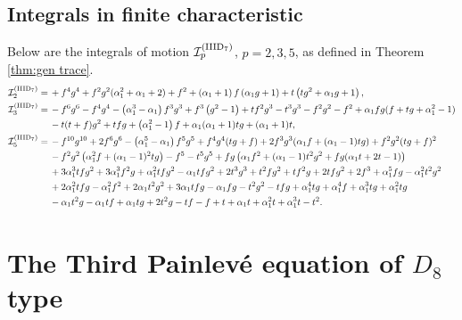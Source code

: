 \documentclass[a4paper,reqno]{amsart}
\numberwithin{equation}{section}
\numberwithin{figure}{section}
\theoremstyle{remark}
\begin{document}
\subsection{Integrals in finite characteristic}
Below are the integrals of motion $\mathcal{I}_p^{(\rm{IIID}_7)}$, $p=2,3,5$, as defined in Theorem \ref{thm:gen trace}.
\begin{align*}
\mathcal{I}_2^{(\rm{IIID}_7)} =\,&+f^4 g^4+f^2g^2(\alpha _1^2+\alpha _1+2)+f^2+\left(\alpha _1+1\right) f \left(\alpha _1 g+1\right)
+t \left(t g^2+\alpha _1 g+1\right),\\
\mathcal{I}_3^{(\rm{IIID}_7)} =\,&-f^6 g^6-f^4 g^4-\left(\alpha_1^3-\alpha_1\right) f^3 g^3+f^3 \left(g^2-1\right)+tf^2 g^3 -t^3g^3-f^2 g^2-f^2+\alpha_1 f g (f+t g+\alpha_1^2-1)\\
&-t  (t+f)g^2+t f g+\left(\alpha_1^2-1\right) f+\alpha_1 (\alpha_1+1) t g
+(\alpha_1+1) t,\\
 \mathcal{I}_5^{(\rm{IIID}_7)} =\,&
 -f^{10} g^{10}+2 f^6 g^6 
 -\left(\alpha_1^5-\alpha_1\right) f^5 g^5 +f^4 g^4 (t g+f)
 +2 f^3 g^3 (\alpha_1 f+(\alpha_1-1) t g)+f^2 g^2 (t g+f)^2\\
 & -f^2 g^2 \left(\alpha_1^2 f+(\alpha_1-1)^2 t g\right)-f^5-t^5 g^5+f g \left(\alpha_1 f^2+(\alpha_1-1) t^2 g^2+f g (\alpha_1 t+2 t-1)\right)\\
 &+3 \alpha_1^3 t f g^2+3 \alpha_1^3 f^2 g+\alpha_1^2 t f g^2- \alpha_1 t f g^2+2 t^3 g^3+t^2 f g^2+t f^2 g+2 t f g^2+2 f^3+\alpha_1^5 f g- \alpha_1^2 t^2 g^2\\
 &+2 \alpha_1^2 t f g- \alpha_1^2 f^2+2 \alpha_1 t^2 g^2+3 \alpha_1 t f g- \alpha_1 f g- t^2 g^2- t f g+\alpha_1^4 t g+\alpha_1^4 f+\alpha_1^3 t g+\alpha_1^2 t g\\
 &- \alpha_1 t^2 g- \alpha_1 t f+\alpha_1 t g+2 t^2 g- t f- f+t+\alpha_1 t+\alpha_1^2 t+\alpha_1^3 t- t^2.
\end{align*}


























\section{The Third Painlev\'e equation of $D_8$ type}\label{sect:p3d8}
\end{document}
